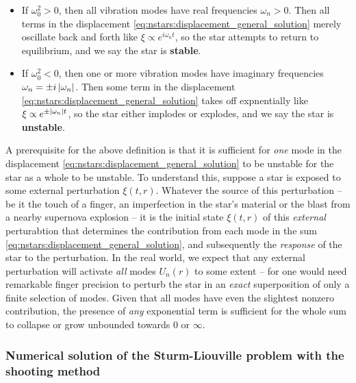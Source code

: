 \begin{itemize}
\item If $\omega_0^2 > 0$, then all vibration modes have real frequencies $\omega_n > 0$.
      Then all terms in the displacement \eqref{eq:nstars:displacement_general_solution} merely oscillate back and forth like $\xi \propto e^{i \omega_n t}$, so the star attempts to return to equilibrium, and we say the star is \textbf{stable}.
\item If $\omega_0^2 < 0$, then one or more vibration modes have imaginary frequencies $\omega_n = \pm i \left\lvert \omega_n \right\rvert$.
      Then some term in the displacement \eqref{eq:nstars:displacement_general_solution} takes off expnentially like $\xi \propto e^{\pm \left\lvert \omega_n \right\rvert t}$, so the star either implodes or explodes, and we say the star is \textbf{unstable}.
\end{itemize}
A prerequisite for the above definition is that it is sufficient for \emph{one} mode in the displacement \eqref{eq:nstars:displacement_general_solution} to be unstable for the star as a whole to be unstable.
To understand this, suppose a star is exposed to some external perturbation $\xi(t,r)$.
Whatever the source of this perturbation -- be it the touch of a finger, an imperfection in the star's material or the blast from a nearby supernova explosion -- it is the initial state $\xi(t,r)$ of this \emph{external} perturabtion that determines the contribution from each mode in the sum \eqref{eq:nstars:displacement_general_solution}, and subsequently the \emph{response} of the star to the perturbation.
In the real world, we expect that any external perturbation will activate \emph{all} modes $U_n(r)$ to some extent -- for one would need remarkable finger precision to perturb the star in an \emph{exact} superposition of only a finite selection of modes.
Given that all modes have even the slightest nonzero contribution, the presence of \emph{any} exponential term is sufficient for the whole sum to collapse or grow unbounded towards $0$ or $\infty$.





\subsubsection{Numerical solution of the Sturm-Liouville problem with the shooting method}

